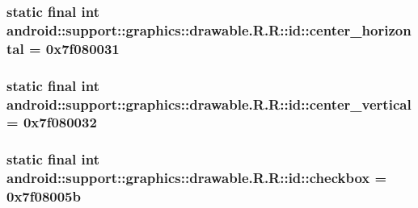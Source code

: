 \hypertarget{classandroid_1_1support_1_1graphics_1_1drawable_1_1_r_1_1id_43a064a854834c8fdb8647f08d3248cd}{
\subsubsection[{center\_\-horizontal}]{\setlength{\rightskip}{0pt plus 5cm}static final int android::support::graphics::drawable.R.R::id::center\_\-horizontal = 0x7f080031}}
\label{classandroid_1_1support_1_1graphics_1_1drawable_1_1_r_1_1id_43a064a854834c8fdb8647f08d3248cd}


\hypertarget{classandroid_1_1support_1_1graphics_1_1drawable_1_1_r_1_1id_dd5ff2884f92338e8f8ae89a920e853c}{
\subsubsection[{center\_\-vertical}]{\setlength{\rightskip}{0pt plus 5cm}static final int android::support::graphics::drawable.R.R::id::center\_\-vertical = 0x7f080032}}
\label{classandroid_1_1support_1_1graphics_1_1drawable_1_1_r_1_1id_dd5ff2884f92338e8f8ae89a920e853c}


\hypertarget{classandroid_1_1support_1_1graphics_1_1drawable_1_1_r_1_1id_1635e3a19cec6038063e1b4e901b076d}{
\subsubsection[{checkbox}]{\setlength{\rightskip}{0pt plus 5cm}static final int android::support::graphics::drawable.R.R::id::checkbox = 0x7f08005b}}
\label{classandroid_1_1support_1_1graphics_1_1drawable_1_1_r_1_1id_1635e3a19cec6038063e1b4e901b076d}


